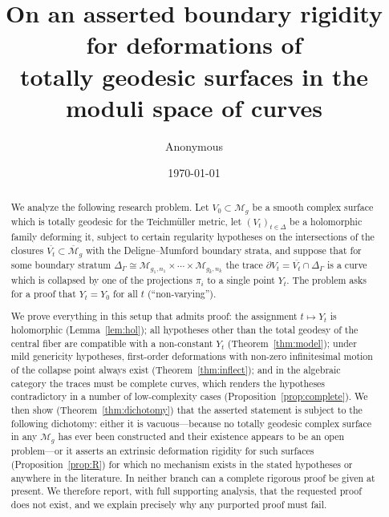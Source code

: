 \documentclass[11pt]{amsart}
\newcommand{\M}{\mathcal{M}}
\theoremstyle{plain}
\theoremstyle{definition}
\theoremstyle{remark}
\begin{document}
\title{On an asserted boundary rigidity for deformations of\\ totally geodesic surfaces in the moduli space of curves}
\author{Anonymous}
\date{\today}

\begin{abstract}
We analyze the following research problem. Let $V_0\subset \M_g$ be a smooth complex
surface which is totally geodesic for the Teichm\"uller metric, let $(V_t)_{t\in\Delta}$
be a holomorphic family deforming it, subject to certain regularity hypotheses on the
intersections of the closures $\overline{V_t}\subset\overline{\M}_g$ with the
Deligne--Mumford boundary strata, and suppose that for some boundary stratum
$\Delta_\Gamma\cong \M_{g_1,n_1}\times\cdots\times \M_{g_k,n_k}$ the trace
$\partial V_t=\overline{V_t}\cap\Delta_\Gamma$ is a curve which is collapsed by one of
the projections $\pi_i$ to a single point $Y_t$. The problem asks for a proof that
$Y_t=Y_0$ for all $t$ (``non-varying'').

We prove everything in this setup that admits proof: the assignment $t\mapsto Y_t$ is
holomorphic (Lemma~\ref{lem:hol}); all hypotheses other than the total geodesy of the
central fiber are compatible with a non-constant $Y_t$ (Theorem~\ref{thm:model});
under mild genericity hypotheses, first-order deformations with non-zero infinitesimal
motion of the collapse point always exist (Theorem~\ref{thm:inflect}); and in the
algebraic category the traces must be complete curves, which renders the hypotheses
contradictory in a number of low-complexity cases (Proposition~\ref{prop:complete}).
We then show (Theorem~\ref{thm:dichotomy}) that the asserted statement is subject to
the following dichotomy: either it is vacuous---because no totally geodesic complex
surface in any $\M_g$ has ever been constructed and their existence appears to be an
open problem---or it asserts an extrinsic deformation rigidity for such surfaces
(Proposition~\ref{prop:R}) for which no mechanism exists in the stated hypotheses or
anywhere in the literature. In neither branch can a complete rigorous proof be given
at present. We therefore report, with full supporting analysis, that the requested
proof does not exist, and we explain precisely why any purported proof must fail.
\end{abstract}

\maketitle
\end{document}
